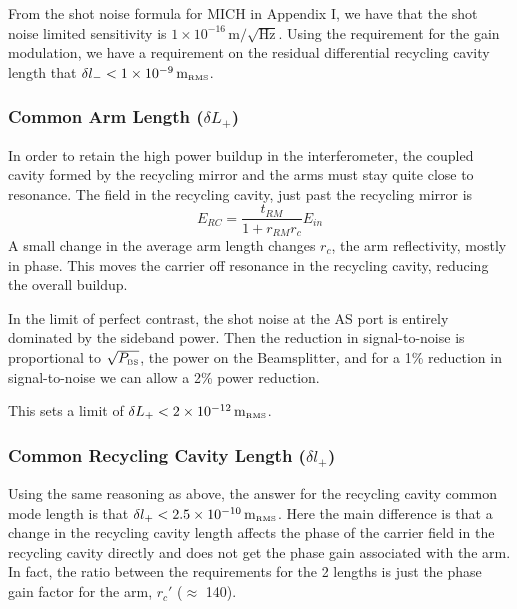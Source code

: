 From the shot noise formula for MICH in Appendix I, we have that the
shot noise limited sensitivity is 
$1 \times 10^{-16} \, \mbox{m}/\sqrt{\mbox{Hz}}$.
Using the requirement for the gain modulation, we have a requirement
on the residual differential recycling cavity length that
{ $\delta l_{-} < 1 \times 10^{-9} \, \mbox{m}_{\mbox {\tiny RMS}}$}.


\subsubsection{Common Arm Length ($\delta L_+$)}

In order to retain the high power buildup in the interferometer, the
coupled cavity formed by the recycling mirror and the arms must stay
quite close to resonance. The field in the recycling cavity, just
past the recycling mirror is
\begin{equation}
E_{RC} = \frac{t_{RM}}{1 + r_{RM} r_{c}} E_{in}
\end{equation}
A small change in the average arm length changes $r_{c}$, the arm
reflectivity, mostly in phase. This moves the carrier off resonance
in the recycling cavity, reducing the overall buildup.

In the limit of perfect contrast, the shot noise at the AS
port is entirely dominated by the sideband power. Then the reduction
in signal-to-noise is proportional to $\sqrt{P_{\mbox{\tiny BS}}}$, the
power on the Beamsplitter, and for
a 1\% reduction in signal-to-noise we can allow a 2\% power reduction.

This sets a limit of 
{ $\delta L_{+} < 2 \times 10^{-12} \, \mbox{m}_{\mbox {\tiny RMS}}$}.


\subsubsection{Common Recycling Cavity Length ($\delta l_+$)}

Using the same reasoning as above, the answer for the recycling cavity
common mode length is that 
{ $\delta l_{+} < 2.5 \times 10^{-10} \, \mbox{m}_{\mbox {\tiny RMS}}$}.
Here the main difference is that a change in the recycling cavity
length affects the phase of the carrier field in the recycling cavity
directly and does not get the phase gain associated with the arm. In
fact, the ratio between the requirements for the 2 lengths is just the
phase gain factor for the arm, $r_c'$ ($\approx$ 140).

